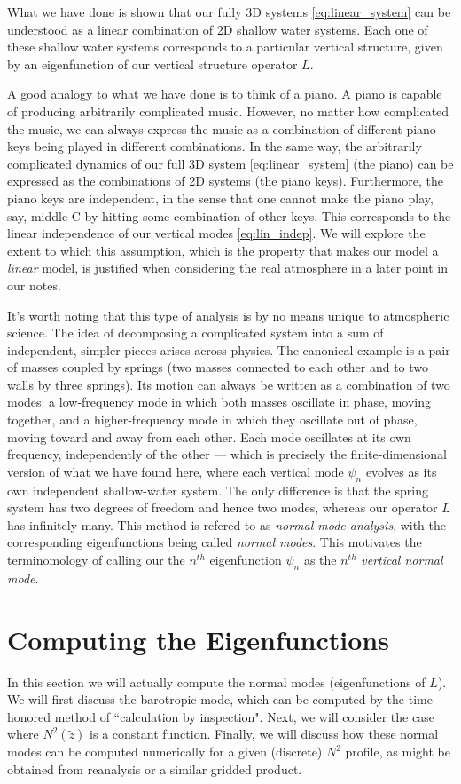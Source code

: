 \documentclass{article}
\numberwithin{equation}{section}
\newcommand{\z}{\tilde{z}}
\begin{document}
What we have done is shown that our fully 3D systems \eqref{eq:linear_system} can be understood as a linear combination of 2D shallow water systems. Each one of these shallow water systems corresponds to a particular vertical structure, given by an eigenfunction of our vertical structure operator $L$. 
\par A good analogy to what we have done is to think of a piano. A piano is capable of producing arbitrarily complicated music. However, no matter how complicated the music, we can always express the music as a combination of different piano keys being played in different combinations. In the same way, the arbitrarily complicated dynamics of our full 3D system \eqref{eq:linear_system} (the piano) can be expressed as the combinations of 2D systems (the piano keys). Furthermore, the piano keys are independent, in the sense that one cannot make the piano play, say, middle C by hitting some combination of other keys. This corresponds to the linear independence of our vertical modes \eqref{eq:lin_indep}. We will explore the extent to which this assumption, which is the property that makes our model a \textit{linear} model, is justified when considering the real atmosphere in a later point in our notes.
\marginnote{\springsmodes}
\par It's worth noting that this type of analysis is by no means unique to atmospheric science. The idea of decomposing a complicated system into a sum of independent, simpler pieces arises across physics. The canonical example is a pair of masses coupled by springs (two masses connected to each other and to two walls by three springs). Its motion can always be written as a combination of two modes: a low-frequency mode in which both masses oscillate in phase, moving together, and a higher-frequency mode in which they oscillate out of phase, moving toward and away from each other. Each mode oscillates at its own frequency, independently of the other — which is precisely the finite-dimensional version of what we have found here, where each vertical mode $\psi_n$ evolves as its own independent shallow-water system. The only difference is that the spring system has two degrees of freedom and hence two modes, whereas our operator $L$ has infinitely many. This method is refered to as \textit{normal mode analysis}, with the corresponding eigenfunctions being called \textit{normal modes}. This motivates the terminomology of calling our the $n^{th}$ eigenfunction $\psi_n$ as the $n^{th}$ \textit{vertical normal mode}.

\section{Computing the Eigenfunctions}
In this section we will actually compute the normal modes (eigenfunctions of $L$). We will first discuss the barotropic mode, which can be computed by the time-honored method of ``calculation by inspection". Next, we will consider the case where $N^2(\z)$ is a constant function. Finally, we will discuss how these normal modes can be computed numerically for a given (discrete) $N^2$ profile, as might be obtained from reanalysis or a similar gridded product. 
\end{document}
